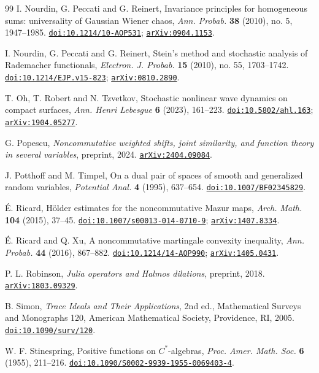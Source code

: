 \documentclass[11pt,a4paper]{amsart}
\numberwithin{equation}{section}
\theoremstyle{definition}
\theoremstyle{remark}
\newcommand{\arxiv}[1]{\href{https://arxiv.org/abs/#1}{\nolinkurl{arXiv:#1}}}
\newcommand{\doi}[1]{\href{https://doi.org/#1}{\nolinkurl{doi:#1}}}
\begin{document}
\begin{thebibliography}{99}
 I. Nourdin, G. Peccati and G. Reinert,
Invariance principles for homogeneous sums: universality of Gaussian Wiener chaos,
\emph{Ann. Probab.} \textbf{38} (2010), no. 5, 1947--1985.
\doi{10.1214/10-AOP531}; \arxiv{0904.1153}.

 I. Nourdin, G. Peccati and G. Reinert,
Stein's method and stochastic analysis of Rademacher functionals,
\emph{Electron. J. Probab.} \textbf{15} (2010), no. 55, 1703--1742.
\doi{10.1214/EJP.v15-823}; \arxiv{0810.2890}.

 T. Oh, T. Robert and N. Tzvetkov,
Stochastic nonlinear wave dynamics on compact surfaces,
\emph{Ann. Henri Lebesgue} \textbf{6} (2023), 161--223.
\doi{10.5802/ahl.163}; \arxiv{1904.05277}.

 G. Popescu,
\emph{Noncommutative weighted shifts, joint similarity, and function theory in several variables},
preprint, 2024. \arxiv{2404.09084}.

 J. Potthoff and M. Timpel,
On a dual pair of spaces of smooth and generalized random variables,
\emph{Potential Anal.} \textbf{4} (1995), 637--654. \doi{10.1007/BF02345829}.

 \'E. Ricard, H\"older estimates for the noncommutative Mazur maps,
\emph{Arch. Math.} \textbf{104} (2015), 37--45.
\doi{10.1007/s00013-014-0710-9}; \arxiv{1407.8334}.

 \'E. Ricard and Q. Xu, A noncommutative martingale convexity inequality,
\emph{Ann. Probab.} \textbf{44} (2016), 867--882.
\doi{10.1214/14-AOP990}; \arxiv{1405.0431}.

 P. L. Robinson, \emph{Julia operators and Halmos dilations}, preprint, 2018.
\arxiv{1803.09329}.

 B. Simon, \emph{Trace Ideals and Their Applications}, 2nd ed., Mathematical Surveys and
Monographs 120, American Mathematical Society, Providence, RI, 2005. \doi{10.1090/surv/120}.

 W. F. Stinespring, Positive functions on $C^*$-algebras,
\emph{Proc. Amer. Math. Soc.} \textbf{6} (1955), 211--216.
\doi{10.1090/S0002-9939-1955-0069403-4}.
\end{thebibliography}
\end{document}
